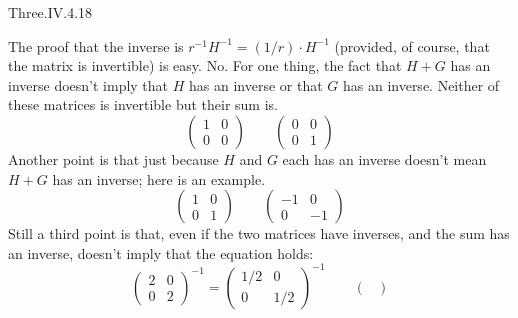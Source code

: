 \begin{ans}{Three.IV.4.18}
      \begin{exparts}
        \partsitem The proof that the inverse is
          \( r^{-1}H^{-1}=(1/r)\cdot H^{-1} \)
          (provided, of course, that the matrix is invertible) is easy.
        \partsitem No.
          For one thing, the fact that $H+G$ has an inverse doesn't imply that
          $H$ has an inverse or that $G$ has an inverse.
          Neither of these matrices is invertible but their sum is.
          \begin{equation*}
            \begin{pmatrix}
              1  &0  \\
              0  &0
            \end{pmatrix}
            \qquad
            \begin{pmatrix}
              0  &0  \\
              0  &1
            \end{pmatrix}
          \end{equation*}
          Another point is that just because $H$ and $G$ each has an inverse
          doesn't mean $H+G$ has an inverse; here is an example.
          \begin{equation*}
            \begin{pmatrix}
              1  &0  \\
              0  &1
            \end{pmatrix}
            \qquad
            \begin{pmatrix}
              -1  &0  \\
               0  &-1
            \end{pmatrix}
          \end{equation*}
          Still a third point is that, even if the two matrices have inverses,
          and the sum has an inverse, doesn't imply that the equation holds:
          \begin{equation*}
            \begin{pmatrix}
              2  &0  \\
              0  &2
            \end{pmatrix}^{-1}
            =\begin{pmatrix}
              1/2  &0  \\
              0    &1/2
            \end{pmatrix}^{-1}
            \qquad
            \begin{pmatrix}

\end{pmatrix}
\end{equation*}
\end{exparts}
\end{ans}
